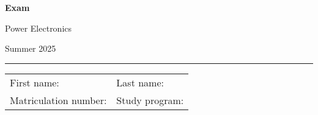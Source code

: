 \begin{center}

    {\vspace{3mm}\Large \textbf{
    \textsf{Exam}}
    \vspace{3mm}
    
    \LARGE
    \textsf{Power Electronics}
    
    \vspace{6mm}
    \large
    
    Summer 2025
    \vspace{5mm}
    }
    
    
\end{center}
    
    \hrule
    
    
    \vspace{5mm}
    
\begin{flushleft}
\begin{tabular}{ll}
    First name:  \qquad \qquad \qquad  \qquad \qquad\qquad \qquad \qquad & Last name: \\[1cm]
     Matriculation number: & Study program:
\end{tabular}
\end{flushleft}


